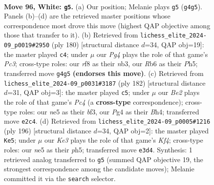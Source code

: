 \documentclass[11pt]{article}
\begin{document}
\clearpage

\begin{figure}[p]\centering
\begin{subfigure}{0.46\textwidth}\centering
\resizebox{\linewidth}{!}{%
\newchessgame
\chessboard[
  setfen={5r2/3k4/PR6/4n3/6P1/4K2P/2P1B3/8 w - - 1 96},
  showmover=false,
  pgfstyle=straightmove, color=movearrow, markmove={g4-g5}
]}
\caption{}
\end{subfigure}\hfill
\begin{subfigure}{0.46\textwidth}\centering
\resizebox{\linewidth}{!}{%
\newchessgame
\chessboard[
  setfen={8/4k1p1/8/5p1P/5P2/1nP1BK2/n7/8 w - - 0 91},
  showmover=false,
  pgfstyle=straightmove, color=movearrow, markmove={c3-c4}
]}
\caption{}
\end{subfigure}
\\[4pt]
\begin{subfigure}{0.46\textwidth}\centering
\resizebox{\linewidth}{!}{%
\newchessgame
\chessboard[
  setfen={5k2/2R5/4r3/7p/2P4B/3K1bP1/8/8 w - - 73 92},
  showmover=false,
  pgfstyle=straightmove, color=movearrow, markmove={c4-c5}
]}
\caption{}
\end{subfigure}\hfill
\begin{subfigure}{0.46\textwidth}\centering
\resizebox{\linewidth}{!}{%
\newchessgame
\chessboard[
  setfen={2r5/4k3/1R4P1/7p/4BK1P/8/8/8 w - - 1 99},
  showmover=false,
  pgfstyle=straightmove, color=movearrow, markmove={f4-e5}
]}
\caption{}
\end{subfigure}
\caption{\textbf{Move 96, White: \texttt{g5}.} (a) Our position; Melanie plays \texttt{g5} (\texttt{g4g5}). Panels (b)--(d) are the retrieved master positions whose correspondence most drove this move (highest QAP objective among those that transfer to it). (b) Retrieved from \texttt{lichess\_elite\_2024-09\_p0019\#2950} (ply 180) [structural distance $d$=34, QAP obj=19]: the master played \texttt{c4}; under $\mu$ our \emph{Pg4} plays the role of that game's \emph{Pc3}; cross-type roles: our \emph{r}f8 as their \emph{n}b3, our \emph{R}b6 as their \emph{P}h5; transferred move \texttt{g4g5} \textbf{(endorses this move)}. (c) Retrieved from \texttt{lichess\_elite\_2024-09\_p0031\#3187} (ply 182) [structural distance $d$=31, QAP obj=3]: the master played \texttt{c5}; under $\mu$ our \emph{Be2} plays the role of that game's \emph{Pc4} (a \textbf{cross-type} correspondence); cross-type roles: our \emph{n}e5 as their \emph{b}f3, our \emph{P}g4 as their \emph{B}h4; transferred move \texttt{e2c4}. (d) Retrieved from \texttt{lichess\_elite\_2024-09\_p0005\#1216} (ply 196) [structural distance $d$=34, QAP obj=2]: the master played \texttt{Ke5}; under $\mu$ our \emph{Ke3} plays the role of that game's \emph{Kf4}; cross-type roles: our \emph{n}e5 as their \emph{p}h5; transferred move \texttt{e3d4}. Synthesis: 1 retrieved analog transferred to \texttt{g5} (summed QAP objective 19, the strongest correspondence among the candidate moves); Melanie committed it via the \texttt{search} selector.}
\label{fig:thought-m190}
\end{figure}
\end{document}
